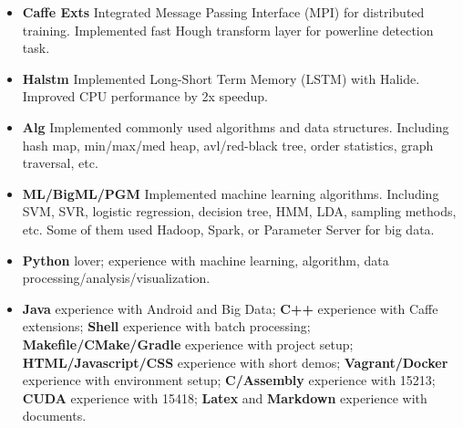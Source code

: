 \documentclass[letterpaper,11pt]{article}
\begin{document}
\begin{itemize}
\item\textbf{Caffe Exts} Integrated Message Passing Interface (MPI) for distributed training.\linebreak
  \hphantom{} Implemented fast Hough transform layer for powerline detection task.
\item\textbf{Halstm} Implemented Long-Short Term Memory (LSTM) with Halide.\linebreak
  \hphantom{} Improved CPU performance by 2x speedup.
\item\textbf{Alg} Implemented commonly used algorithms and data structures.\linebreak
  \hphantom{} Including hash map, min/max/med heap, avl/red-black tree, order statistics, graph traversal, etc.
\item\textbf{ML/BigML/PGM} Implemented machine learning algorithms.\linebreak
  \hphantom{} Including SVM, SVR, logistic regression, decision tree, HMM, LDA, sampling methods, etc.\linebreak
  \hphantom{} Some of them used Hadoop, Spark, or Parameter Server for big data.
\end{itemize}

\begin{itemize}
\item \textbf{Python} lover; experience with machine learning, algorithm, data processing/analysis/visualization.
\item \textbf{Java} experience with Android and Big Data; \textbf{C++} experience with Caffe extensions; \textbf{Shell} experience with batch processing; \textbf{Makefile/CMake/Gradle} experience with project setup; \textbf{HTML/Javascript/CSS} experience with short demos; \textbf{Vagrant/Docker} experience with environment setup; \textbf{C/Assembly} experience with 15213; \textbf{CUDA} experience with 15418; \textbf{Latex} and \textbf{Markdown} experience with documents.
\end{itemize}
 
\end{document}
